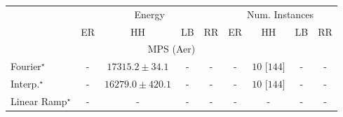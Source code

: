 \begin{tabular}{l|cccc|cccc|}
\toprule
& \multicolumn{4}{c|}{Energy} & \multicolumn{4}{c|}{Num. Instances} \\
            & ER & HH & LB & RR & ER & HH & LB & RR \\
\midrule
\multicolumn{9}{c}{\rule{0pt}{8pt}MPS (Aer)} \\
\midrule
Fourier$^\star$ & {\cellcolor[HTML]{000000}} \color[HTML]{F1F1F1} {\cellcolor{white}} \color{black} - & {\cellcolor[HTML]{4D004B}} \color[HTML]{F1F1F1} $17315.2\pm 34.1$ & {\cellcolor[HTML]{000000}} \color[HTML]{F1F1F1} {\cellcolor{white}} \color{black} - & {\cellcolor[HTML]{000000}} \color[HTML]{F1F1F1} {\cellcolor{white}} \color{black} - & {\cellcolor[HTML]{000000}} \color[HTML]{F1F1F1} {\cellcolor{white}} \color{black} - & {\cellcolor[HTML]{49006A}} \color[HTML]{F1F1F1} $10$ [$144$] & {\cellcolor[HTML]{000000}} \color[HTML]{F1F1F1} {\cellcolor{white}} \color{black} - & {\cellcolor[HTML]{000000}} \color[HTML]{F1F1F1} {\cellcolor{white}} \color{black} - \\
Interp.$^\star$ & {\cellcolor[HTML]{000000}} \color[HTML]{F1F1F1} {\cellcolor{white}} \color{black} - & {\cellcolor[HTML]{9AB4D6}} \color[HTML]{000000} $16279.0\pm 420.1$ & {\cellcolor[HTML]{000000}} \color[HTML]{F1F1F1} {\cellcolor{white}} \color{black} - & {\cellcolor[HTML]{000000}} \color[HTML]{F1F1F1} {\cellcolor{white}} \color{black} - & {\cellcolor[HTML]{000000}} \color[HTML]{F1F1F1} {\cellcolor{white}} \color{black} - & {\cellcolor[HTML]{49006A}} \color[HTML]{F1F1F1} $10$ [$144$] & {\cellcolor[HTML]{000000}} \color[HTML]{F1F1F1} {\cellcolor{white}} \color{black} - & {\cellcolor[HTML]{000000}} \color[HTML]{F1F1F1} {\cellcolor{white}} \color{black} - \\
Linear Ramp$^\star$ & {\cellcolor[HTML]{000000}} \color[HTML]{F1F1F1} {\cellcolor{white}} \color{black} - & {\cellcolor[HTML]{000000}} \color[HTML]{F1F1F1} {\cellcolor{white}} \color{black} - & {\cellcolor[HTML]{000000}} \color[HTML]{F1F1F1} {\cellcolor{white}} \color{black} - & {\cellcolor[HTML]{000000}} \color[HTML]{F1F1F1} {\cellcolor{white}} \color{black} - & {\cellcolor[HTML]{000000}} \color[HTML]{F1F1F1} {\cellcolor{white}} \color{black} - & {\cellcolor[HTML]{000000}} \color[HTML]{F1F1F1} {\cellcolor{white}} \color{black} - & {\cellcolor[HTML]{000000}} \color[HTML]{F1F1F1} {\cellcolor{white}} \color{black} - & {\cellcolor[HTML]{000000}} \color[HTML]{F1F1F1} {\cellcolor{white}} \color{black} - \\

\end{tabular}
